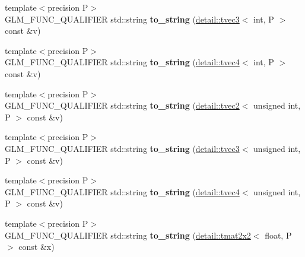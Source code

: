 \begin{DoxyCompactItemize}
\item 
{\footnotesize template$<$precision P$>$ }\\G\+L\+M\+\_\+\+F\+U\+N\+C\+\_\+\+Q\+U\+A\+L\+I\+F\+I\+ER std\+::string {\bfseries to\+\_\+string} (\hyperlink{structglm_1_1detail_1_1tvec3}{detail\+::tvec3}$<$ int, P $>$ const \&v)\hypertarget{namespaceglm_a79470a720acf0a316891820afe09e162}{}\label{namespaceglm_a79470a720acf0a316891820afe09e162}

\item 
{\footnotesize template$<$precision P$>$ }\\G\+L\+M\+\_\+\+F\+U\+N\+C\+\_\+\+Q\+U\+A\+L\+I\+F\+I\+ER std\+::string {\bfseries to\+\_\+string} (\hyperlink{structglm_1_1detail_1_1tvec4}{detail\+::tvec4}$<$ int, P $>$ const \&v)\hypertarget{namespaceglm_a78dd6af1769c80de03bb124d73e274f2}{}\label{namespaceglm_a78dd6af1769c80de03bb124d73e274f2}

\item 
{\footnotesize template$<$precision P$>$ }\\G\+L\+M\+\_\+\+F\+U\+N\+C\+\_\+\+Q\+U\+A\+L\+I\+F\+I\+ER std\+::string {\bfseries to\+\_\+string} (\hyperlink{structglm_1_1detail_1_1tvec2}{detail\+::tvec2}$<$ unsigned int, P $>$ const \&v)\hypertarget{namespaceglm_a801319a82197f1c81cd8ec003bbb73d0}{}\label{namespaceglm_a801319a82197f1c81cd8ec003bbb73d0}

\item 
{\footnotesize template$<$precision P$>$ }\\G\+L\+M\+\_\+\+F\+U\+N\+C\+\_\+\+Q\+U\+A\+L\+I\+F\+I\+ER std\+::string {\bfseries to\+\_\+string} (\hyperlink{structglm_1_1detail_1_1tvec3}{detail\+::tvec3}$<$ unsigned int, P $>$ const \&v)\hypertarget{namespaceglm_a696c89ed265323c985319eecccf3ddc8}{}\label{namespaceglm_a696c89ed265323c985319eecccf3ddc8}

\item 
{\footnotesize template$<$precision P$>$ }\\G\+L\+M\+\_\+\+F\+U\+N\+C\+\_\+\+Q\+U\+A\+L\+I\+F\+I\+ER std\+::string {\bfseries to\+\_\+string} (\hyperlink{structglm_1_1detail_1_1tvec4}{detail\+::tvec4}$<$ unsigned int, P $>$ const \&v)\hypertarget{namespaceglm_a50a689738a61d3beddf88fbeae5ab2cc}{}\label{namespaceglm_a50a689738a61d3beddf88fbeae5ab2cc}

\item 
{\footnotesize template$<$precision P$>$ }\\G\+L\+M\+\_\+\+F\+U\+N\+C\+\_\+\+Q\+U\+A\+L\+I\+F\+I\+ER std\+::string {\bfseries to\+\_\+string} (\hyperlink{structglm_1_1detail_1_1tmat2x2}{detail\+::tmat2x2}$<$ float, P $>$ const \&x)\hypertarget{namespaceglm_a0eb5e5f8bfab4c965ed9f4d8f0ef910a}{}\label{namespaceglm_a0eb5e5f8bfab4c965ed9f4d8f0ef910a}


\end{DoxyCompactItemize}
